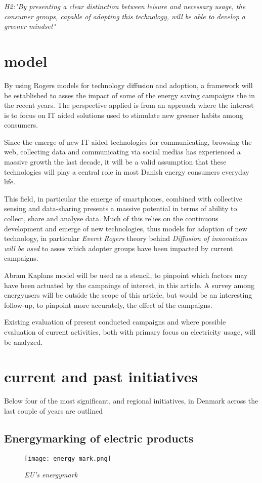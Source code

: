 \documentclass[journal]{IEEEtran}
\begin{document}
\textit{H2:"By presenting a clear distinction between leisure and necessary usage, the consumer groups, capable of adopting this technology, will be able to develop a greener mindset"}

\section{model}
By using Rogers models for technology diffusion and adoption, a framework will be established to asses the impact of some of the energy saving campaigns the in the recent years.
The perspective applied is from an approach where the interest is to focus on IT aided solutions used to stimulate new greener habits among consumers.

Since the emerge of new IT aided technologies for communicating,  browsing the web, collecting data and communicating via social medias has experienced a massive growth the last decade, it will be a valid assumption that these technologies will play a central role in most Danish energy consumers everyday life.

This field, in particular the emerge of smartphones, combined with collective sensing and data-sharing presents a massive potential in terms of ability to collect, share and analyse data. Much of this relies on the continuous development and emerge of new technologies, thus models for adoption of new technology, in particular \textit{Everet Rogers } theory behind \textit{Diffusion of innovations will be used} to asses which adopter groups have been impacted by current campaigns.

Abram Kaplans model will be used as a stencil, to pinpoint which factors may have been actuated by the campaings of interest, in this article. A survey among energyusers will be outside the scope of this article, but would be an interesting follow-up, to pinpoint more accurately, the effect of the campaigns.  

Existing evaluation of present conducted campaigns and where possible evaluation of current activities, both with primary focus on electricity usage, will be analyzed.


\section{current and past initiatives}
Below four of the most significant, and regional initiatives, in Denmark across the last couple of years are outlined

\subsection{Energymarking of electric products}
\begin{figure}
\texttt{[image: energy\_mark.png]}
\caption{\textit{EU's energymark}}			
\label{fig:emark} %
\end{figure}
\end{document}
